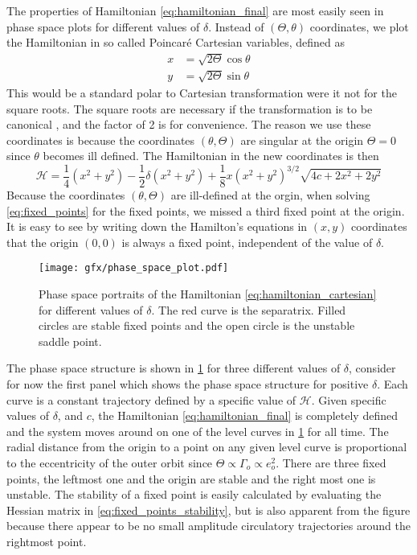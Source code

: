 \documentclass[ twoside,openright,titlepage,numbers=noenddot,headinclude,%
                footinclude=true,cleardoublepage=empty,abstractoff, %
                BCOR=5mm,paper=a4,fontsize=11pt,%
                american,%
                ]{scrreprt}
\begin{document}
The properties of Hamiltonian \ref{eq:hamiltonian_final} are most easily seen
in phase space plots for different values of $\delta$. Instead of $(\Theta,\theta)$ 
coordinates, we plot the Hamiltonian
in so called Poincaré Cartesian variables, defined as 
\begin{equation}
    \begin{aligned}
        x&=\sqrt{2\Theta}\cos\theta\\
        y&=\sqrt{2\Theta}\sin\theta
    \end{aligned}
\end{equation}
This would be a standard polar to Cartesian transformation were it not for the 
square roots. The square roots are necessary if the transformation is to be 
canonical \citep{sylvio}, and the factor of 2 is for convenience. The reason
we use these coordinates is because the coordinates $(\theta,\Theta)$ are
singular at the origin $\Theta=0$ since $\theta$ becomes ill defined. 
The Hamiltonian in the new coordinates is then
\begin{equation}
    \mathcal{H}= \frac{1}{4}\left( x^2+y^2\right) - \frac{1}{2}\delta\left(
    x^2+y^2\right)+ \frac{1}{8} x\left(x^2+y^2\right)^{3/2}\sqrt{4c+2x^2+2y^2}
    \label{eq:hamiltonian_cartesian}
\end{equation}
Because the coordinates $(\theta,\Theta)$ are ill-defined at the orgin, when
solving \cref{eq:fixed_points} for the fixed points, we missed a third fixed 
point at the origin. It is easy to see by writing down the Hamilton's
equations in $(x,y)$ coordinates that the origin $(0,0)$ is always a fixed
point, independent of the value of $\delta$.
\begin{figure}
\centering
\texttt{[image: gfx/phase\_space\_plot.pdf]}
    \caption{Phase space portraits of the Hamiltonian 
    \ref{eq:hamiltonian_cartesian} for different values of 
    $\delta$. The red curve
    is the separatrix. Filled circles are stable fixed points and the open
    circle is the unstable saddle point.}
\label{fig:phase_space}
\end{figure}

The phase space structure is shown in \cref{fig:phase_space} for three different
values of $\delta$, consider for now the first panel which shows the phase space
structure for positive $\delta$. Each curve is a constant trajectory defined by a specific value
of $\mathcal{H}$. Given specific values of $\delta$, and $c$, the Hamiltonian 
\ref{eq:hamiltonian_final} is completely defined and the system moves around on
one of the level curves in \cref{fig:phase_space} for all time. The radial distance
from the origin to a point on any given level curve is proportional to the eccentricity
of the outer orbit since $\Theta\propto
\Gamma_o\propto e_o^2$. There are three fixed points, the
leftmost one and the origin are stable and the right most one is unstable. The 
stability of a fixed point is easily calculated by evaluating the Hessian matrix in
\cref{eq:fixed_points_stability}, but is also apparent from the figure because there
appear to be no small amplitude circulatory trajectories around the rightmost point. 
\end{document}
